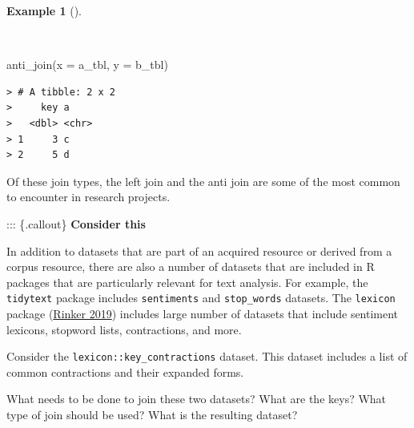 \documentclass[
  letterpaper,
  DIV=11,
  numbers=noendperiod]{scrreport}
\newenvironment{Shaded}{\begin{snugshade}}{\end{snugshade}}
\newcommand{\AttributeTok}[1]{\textcolor[rgb]{0.00,0.00,0.00}{#1}}
\newcommand{\FunctionTok}[1]{\textcolor[rgb]{0.00,0.00,0.00}{#1}}
\newcommand{\NormalTok}[1]{\textcolor[rgb]{0.00,0.00,0.00}{#1}}
\theoremstyle{definition}
\newtheorem{example}{Example}[chapter]
\theoremstyle{remark}
\begin{document}
\begin{example}[]\protect\hypertarget{exm-td-merging-join-anti}{}\label{exm-td-merging-join-anti}

~

\begin{Shaded}
\begin{Highlighting}[]
\FunctionTok{anti\_join}\NormalTok{(}\AttributeTok{x =}\NormalTok{ a\_tbl, }\AttributeTok{y =}\NormalTok{ b\_tbl)}
\end{Highlighting}
\end{Shaded}

\begin{verbatim}
> # A tibble: 2 x 2
>     key a    
>   <dbl> <chr>
> 1     3 c    
> 2     5 d
\end{verbatim}

\end{example}

Of these join types, the left join and the anti join are some of the
most common to encounter in research projects.

::: \{.callout\} \textbf{ Consider this}

In addition to datasets that are part of an acquired resource or derived
from a corpus resource, there are also a number of datasets that are
included in R packages that are particularly relevant for text analysis.
For example, the \texttt{tidytext} package includes \texttt{sentiments}
and \texttt{stop\_words} datasets. The \texttt{lexicon} package
(\protect\hyperlink{ref-R-lexicon}{Rinker 2019}) includes large number
of datasets that include sentiment lexicons, stopword lists,
contractions, and more.

Consider the \texttt{lexicon::key\_contractions} dataset. This dataset
includes a list of common contractions and their expanded forms.

What needs to be done to join these two datasets? What are the keys?
What type of join should be used? What is the resulting dataset?
\end{document}
